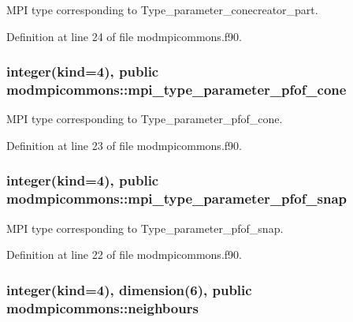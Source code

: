 M\-P\-I type corresponding to Type\-\_\-parameter\-\_\-conecreator\-\_\-part. 



Definition at line 24 of file modmpicommons.\-f90.

\hypertarget{classmodmpicommons_a218b0422727269c7f9cff7a8eb5b22bc}{
\subsubsection[{mpi\-\_\-type\-\_\-parameter\-\_\-pfof\-\_\-cone}]{\setlength{\rightskip}{0pt plus 5cm}integer(kind=4), public modmpicommons\-::mpi\-\_\-type\-\_\-parameter\-\_\-pfof\-\_\-cone}}\label{classmodmpicommons_a218b0422727269c7f9cff7a8eb5b22bc}


M\-P\-I type corresponding to Type\-\_\-parameter\-\_\-pfof\-\_\-cone. 



Definition at line 23 of file modmpicommons.\-f90.

\hypertarget{classmodmpicommons_ab52ab5f47b5ef66ae14b8fb64521b798}{
\subsubsection[{mpi\-\_\-type\-\_\-parameter\-\_\-pfof\-\_\-snap}]{\setlength{\rightskip}{0pt plus 5cm}integer(kind=4), public modmpicommons\-::mpi\-\_\-type\-\_\-parameter\-\_\-pfof\-\_\-snap}}\label{classmodmpicommons_ab52ab5f47b5ef66ae14b8fb64521b798}


M\-P\-I type corresponding to Type\-\_\-parameter\-\_\-pfof\-\_\-snap. 



Definition at line 22 of file modmpicommons.\-f90.

\hypertarget{classmodmpicommons_aeb9144358efbf3350b75103e7c5e356f}{
\subsubsection[{neighbours}]{\setlength{\rightskip}{0pt plus 5cm}integer(kind=4), dimension(6), public modmpicommons\-::neighbours}}\label{classmodmpicommons_aeb9144358efbf3350b75103e7c5e356f}


